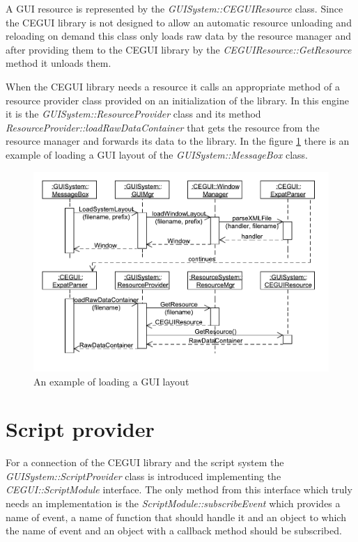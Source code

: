 \documentclass[a4paper, 12pt]{report}
\begin{document}
A GUI resource is represented by the \emph{GUISystem::CEGUIResource} class. Since the CEGUI library is not designed to allow an automatic resource unloading and reloading on demand this class only loads raw data by the resource manager and after providing them to the CEGUI library by the \emph{CEGUIResource::GetResource} method it unloads them.

When the CEGUI library needs a resource it calls an appropriate method of a resource provider class provided on an initialization of the library. In this engine it is the \emph{GUISystem::ResourceProvider} class and its method \emph{ResourceProvider::loadRawDataContainer} that gets the resource from the resource manager and forwards its data to the library. In the figure \ref{fig:load-layout-sequence} there is an example of loading a GUI layout of the \emph{GUISystem::MessageBox} class.

\begin{figure}[htbp]
	\centering
		\includegraphics[width=1\textwidth]{LoadLayoutSequence.pdf}
	\caption{An example of loading a GUI layout}
	\label{fig:load-layout-sequence}
\end{figure}

\section{Script provider}
\label{sec:gui-script}

For a connection of the CEGUI library and the script system the \emph{GUISystem::ScriptProvider} class is introduced implementing the \emph{CEGUI::Script\-Module} interface. The only method from this interface which truly needs an implementation is the \emph{ScriptModule::subscribeEvent} which provides a name of event, a name of function that should handle it and an object to which the name of event and an object with a callback method should be subscribed.
\end{document}
